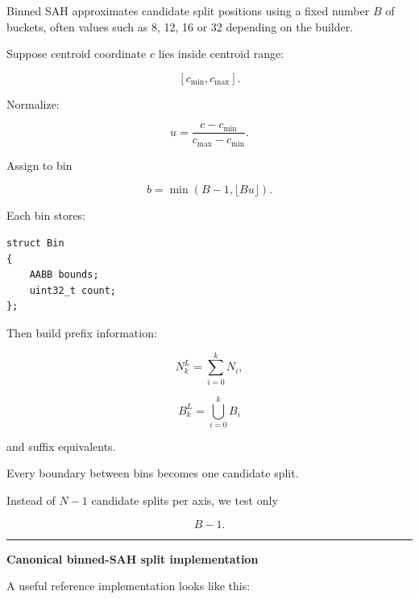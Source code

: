 Binned SAH approximates candidate split positions using a fixed number \(B\) of buckets, often values such as 8, 12, 16 or 32 depending on the builder.

Suppose centroid coordinate \(c\) lies inside centroid range:

\[
[c_{\min},c_{\max}].
\]

Normalize:

\[
u=
\frac{c-c_{\min}}
{c_{\max}-c_{\min}}.
\]

Assign to bin

\[
b=
\min(
B-1,
\lfloor Bu\rfloor
).
\]

Each bin stores:

\begin{verbatim}
struct Bin
{
    AABB bounds;
    uint32_t count;
};
\end{verbatim}

Then build prefix information:

\[
N^L_k
=
\sum_{i=0}^{k}N_i,
\]

\[
B^L_k
=
\bigcup_{i=0}^{k}B_i
\]

and suffix equivalents.

Every boundary between bins becomes one candidate split.

Instead of \(N-1\) candidate splits per axis, we test only

\[
B-1.
\]

\begin{center}\rule{0.5\linewidth}{0.5pt}\end{center}

\textbf{Canonical binned-SAH split implementation}

A useful reference implementation looks like this:

